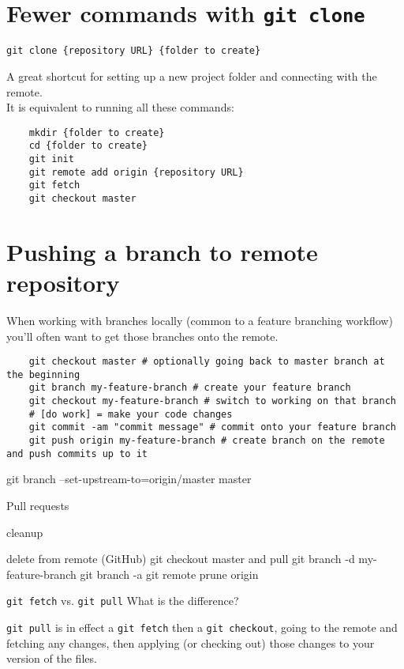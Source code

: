 \section{Fewer commands with \texttt{git clone}}

\texttt{git clone \{repository URL\} \{folder to create\}}

A great shortcut for setting up a new project folder and connecting with the remote.
\\

It is equivalent to running all these commands:

\begin{verbatim}
    mkdir {folder to create}
    cd {folder to create}
    git init
    git remote add origin {repository URL}
    git fetch
    git checkout master
\end{verbatim}

\section{Pushing a branch to remote repository}

When working with branches locally (common to a feature branching workflow) you'll often want to get those branches onto the remote.

\begin{verbatim}
    git checkout master # optionally going back to master branch at the beginning
    git branch my-feature-branch # create your feature branch
    git checkout my-feature-branch # switch to working on that branch
    # [do work] = make your code changes
    git commit -am "commit message" # commit onto your feature branch
    git push origin my-feature-branch # create branch on the remote and push commits up to it
\end{verbatim}

git branch --set-upstream-to=origin/master master


Pull requests


cleanup

delete from remote (GitHub)
git checkout master and pull
git branch -d my-feature-branch
git branch -a
git remote prune origin


\begin{infobox}{\texttt{git fetch} vs. \texttt{git pull}}
    What is the difference?

    \texttt{git pull} is in effect a \texttt{git fetch} then a \texttt{git checkout}, going to the remote and fetching any changes, then applying (or checking out) those changes to your version of the files.
\end{infobox}